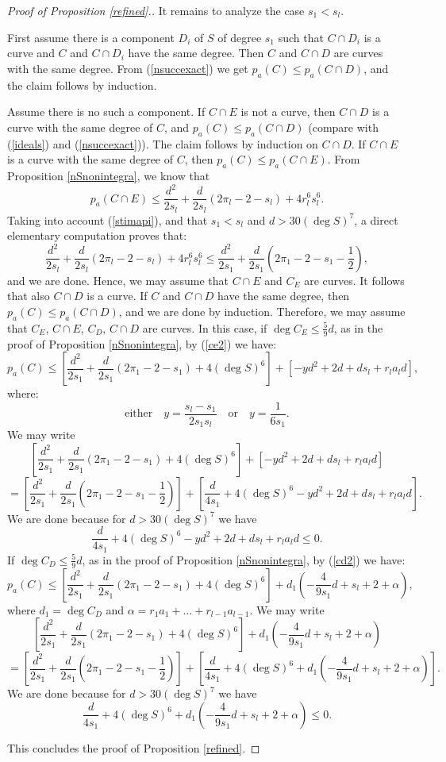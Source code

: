 \documentclass[9pt,a4paper]{amsart}
\theoremstyle{plain}
\theoremstyle{definition}
\theoremstyle{remark}
\begin{document}
\begin{proof}[Proof of Proposition \ref{refined}.]
\smallskip
It remains to analyze the case $s_1<s_l$.

\smallskip
First assume there is a component $D_i$ of $S$ of  degree $s_1$ such
that $C\cap D_i$ is a curve and $C$ and $C\cap D_i$ have the same
degree. Then $C$ and $C\cap D$ are curves with the same degree. From
(\ref{nsuccexact}) we get $p_a(C)\leq p_a(C\cap D)$, and the claim
follows by induction.

\smallskip
Assume there is no such a component. If $C\cap E$ is not a curve,
then $C\cap D$ is a curve with the same degree of $C$, and
$p_a(C)\leq p_a(C\cap D)$ (compare with (\ref{ideals}) and (\ref{nsuccexact})). The claim follows by induction on $C\cap
D$. If $C\cap E$ is a curve with the same degree of $C$, then
$p_a(C)\leq p_a(C\cap E)$. From Proposition \ref{nSnonintegra}, we
know that
$$
p_a(C\cap E)\leq
\frac{d^2}{2s_l}+\frac{d}{2s_l}(2\pi_l-2-s_l)+4r_l^6s_l^6.
$$
Taking into account (\ref{stimapi}), and that $s_1<s_l$ and
$d>30(\deg S)^7$, a direct elementary computation proves that:
$$
\frac{d^2}{2s_l}+\frac{d}{2s_l}(2\pi_l-2-s_l)+4r_l^6s_l^6\leq
\frac{d^2}{2s_1}+\frac{d}{2s_1}\left(2\pi_1-2-s_1-\frac{1}{2}\right),
$$
and we are done. Hence, we may assume that $C\cap E$ and $C_E$ are
curves. It follows that also $C\cap D$ is a curve. If $C$ and $C\cap
D$ have the same degree, then $p_a(C)\leq p_a(C\cap D)$, and we are
done by induction. Therefore, we may assume that $C_E$, $C\cap E$,
$C_D$, $C\cap D$ are curves. In this case, if $\deg C_E\leq
\frac{5}{9}d$, as in the proof of Proposition \ref{nSnonintegra}, by
(\ref{ce2}) we have:
$$
p_a(C)\leq
\left[\frac{d^2}{2s_1}+\frac{d}{2s_1}(2\pi_1-2-s_1)+4(\deg
S)^6\right] +\left[-yd^2+2d +ds_l+r_la_ld\right],
$$
where:
$$
{\text{either}}\quad y=\frac{s_l-s_1}{2s_1s_l}\quad {\text{or}}\quad
y=\frac{1}{6s_1}.
$$
We may write
$$
\left[\frac{d^2}{2s_1}+\frac{d}{2s_1}(2\pi_1-2-s_1)+4(\deg
S)^6\right] +\left[-yd^2+2d +ds_l+r_la_ld\right]
$$
$$
=\left[\frac{d^2}{2s_1}+\frac{d}{2s_1}\left(2\pi_1-2-s_1-\frac{1}{2}\right)\right]+\left[\frac{d}{4s_1}+4(\deg
S)^6-yd^2+2d +ds_l+r_la_ld\right].
$$
We are done because for $d>30(\deg S)^7$ we have
$$
\frac{d}{4s_1}+4(\deg S)^6-yd^2+2d +ds_l+r_la_ld\leq 0.
$$
If  $\deg C_D\leq \frac{5}{9}d$, as in the proof of Proposition
\ref{nSnonintegra}, by (\ref{cd2}) we have:
$$
p_a(C)\leq
\left[\frac{d^2}{2s_1}+\frac{d}{2s_1}(2\pi_1-2-s_1)+4(\deg
S)^6\right]+d_1\left(-\frac{4}{9s_1}d+s_l+2+\alpha \right),
$$
where $d_1=\deg C_D$ and $\alpha=r_1a_1+\dots+r_{l-1}a_{l-1}$. We
may write
$$
\left[\frac{d^2}{2s_1}+\frac{d}{2s_1}(2\pi_1-2-s_1)+4(\deg
S)^6\right]+d_1\left(-\frac{4}{9s_1}d+s_l+2+\alpha \right)
$$
$$
=\left[\frac{d^2}{2s_1}+\frac{d}{2s_1}\left(2\pi_1-2-s_1-\frac{1}{2}\right)\right]+\left[\frac{d}{4s_1}+4(\deg
S)^6+d_1\left(-\frac{4}{9s_1}d+s_l+2+\alpha \right)\right].
$$
We are done because for $d>30(\deg S)^7$ we have
$$
\frac{d}{4s_1}+4(\deg S)^6+d_1\left(-\frac{4}{9s_1}d+s_l+2+\alpha
\right)\leq 0.
$$

\smallskip
This concludes the proof of Proposition \ref{refined}.
\end{proof}
\end{document}

